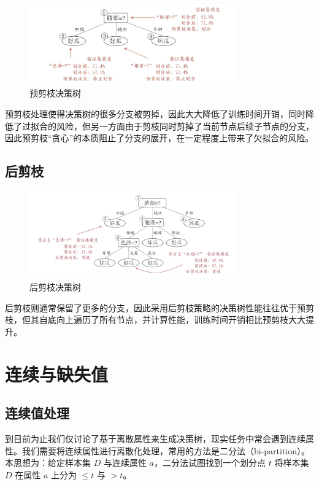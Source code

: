 \documentclass[12pt, a4paper]{article} %
\begin{document}
\begin{figure}[H]
    \centering
    \includegraphics[width=0.8\textwidth]{../img/4-4-预剪枝决策树.png}
    \caption{预剪枝决策树}
    \label{fig:预剪枝决策树}
\end{figure}

预剪枝处理使得决策树的很多分支被剪掉，因此大大降低了训练时间开销，同时降低了过拟合的风险，但另一方面由于剪枝同时剪掉了当前节点后续子节点的分支，因此预剪枝“贪心”的本质阻止了分支的展开，在一定程度上带来了欠拟合的风险。

\subsection{后剪枝}

\begin{figure}[H]
    \centering
    \includegraphics[width=0.8\textwidth]{../img/4-5-后剪枝决策树.png}
    \caption{后剪枝决策树}
    \label{fig:后剪枝决策树}
\end{figure}

后剪枝则通常保留了更多的分支，因此采用后剪枝策略的决策树性能往往优于预剪枝，但其自底向上遍历了所有节点，并计算性能，训练时间开销相比预剪枝大大提升。

\section{连续与缺失值}

\subsection{连续值处理}

到目前为止我们仅讨论了基于离散属性来生成决策树，现实任务中常会遇到连续属性。我们需要将连续属性进行离散化处理，常用的方法是二分法（bi-partition）。本思想为：给定样本集 $D$ 与连续属性 $a$，二分法试图找到一个划分点 $t$ 将样本集 $D$ 在属性 $a$ 上分为 $\le t$ 与 $>t$。
\end{document}
